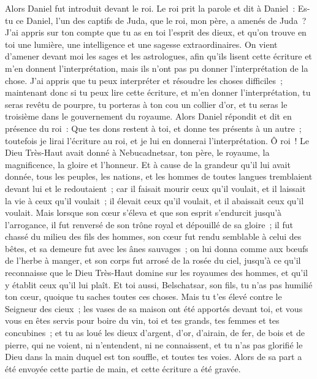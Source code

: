 \begin{multicols}{2}
Alors Daniel fut introduit devant le roi. Le roi prit la parole et dit à Daniel~: Es-tu ce Daniel, l'un des captifs de Juda, que le roi, mon père, a amenés de Juda~?
J'ai appris sur ton compte que tu as en toi l'esprit des dieux, et qu'on trouve en toi une lumière, une intelligence et une sagesse extraordinaires.
On vient d'amener devant moi les sages et les astrologues, afin qu'ils lisent cette écriture et m'en donnent l'interprétation, mais ils n'ont pas pu donner l'interprétation de la chose.
J'ai appris que tu peux interpréter et résoudre les choses difficiles~; maintenant donc si tu peux lire cette écriture, et m'en donner l'interprétation, tu seras revêtu de pourpre, tu porteras à ton cou un collier d'or, et tu seras le troisième dans le gouvernement du royaume.
Alors Daniel répondit et dit en présence du roi~: Que tes dons restent à toi, et donne tes présents à un autre~; toutefois je lirai l'écriture au roi, et je lui en donnerai l'interprétation.
Ô roi~! Le Dieu Très-Haut avait donné à Nebucadnetsar, ton père, le royaume, la magnificence, la gloire et l'honneur.
Et à cause de la grandeur qu'il lui avait donnée, tous les peuples, les nations, et les hommes de toutes langues tremblaient devant lui et le redoutaient~; car il faisait mourir ceux qu'il voulait, et il laissait la vie à ceux qu'il voulait~; il élevait ceux qu'il voulait, et il abaissait ceux qu'il voulait.
Mais lorsque son cœur s'éleva et que son esprit s'endurcit jusqu'à l'arrogance, il fut renversé de son trône royal et dépouillé de sa gloire~;
il fut chassé du milieu des fils des hommes, son cœur fut rendu semblable à celui des bêtes, et sa demeure fut avec les ânes sauvages~; on lui donna comme aux bœufs de l'herbe à manger, et son corps fut arrosé de la rosée du ciel, jusqu'à ce qu'il reconnaisse que le Dieu Très-Haut domine sur les royaumes des hommes, et qu'il y établit ceux qu'il lui plaît.
Et toi aussi, Belschatsar, son fils, tu n'as pas humilié ton cœur, quoique tu saches toutes ces choses.
Mais tu t'es élevé contre le Seigneur des cieux~; les vases de sa maison ont été apportés devant toi, et vous vous en êtes servis pour boire du vin, toi et tes grands, tes femmes et tes concubines~; et tu as loué les dieux d'argent, d'or, d'airain, de fer, de bois et de pierre, qui ne voient, ni n'entendent, ni ne connaissent, et tu n'as pas glorifié le Dieu dans la main duquel est ton souffle, et toutes tes voies.
Alors de sa part a été envoyée cette partie de main, et cette écriture a été gravée.

\end{multicols}
